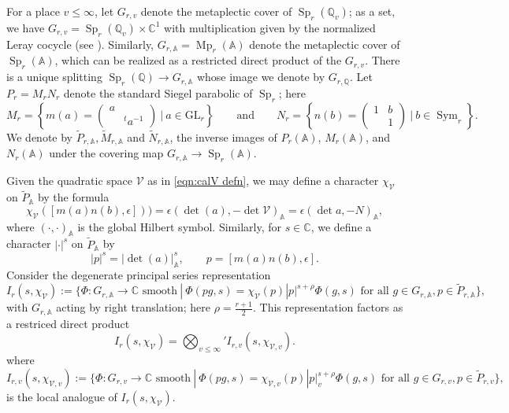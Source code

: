 \documentclass[reqno,oneside]{amsart}
\theoremstyle{plain}
\theoremstyle{remark}
\numberwithin{theorem}{section}
\newcommand{\bbA}{\mathbb A}
\newcommand{\bbC}{\mathbb C}
\newcommand{\bbQ}{\mathbb Q}
\newcommand{\calV}{\mathcal V}
\DeclareMathOperator{\Sym}{Sym}
\DeclareMathOperator{\Sp}{Sp}
\newcommand{\GL}{\mathrm{GL}}
\DeclareMathOperator{\Mp}{Mp}
\begin{document}
	For a place $v \leq \infty$, let $G_{r,v}$ denote the metaplectic cover of $\Sp_{r}(\bbQ_v)$; as a set,  we have $G_{r,v} = \Sp_r(\bbQ_v) \times \bbC^{1}$   with multiplication given by the normalized Leray cocycle (see \cite[\S 8.5]{KRYbook}).
	Similarly, $G_{r, \bbA} = \Mp_r(\bbA)$ denote the metaplectic cover of $\Sp_r(\bbA)$, which can be realized as a restricted direct product of the $G_{r,v}$. There is a unique splitting $\Sp_r(\bbQ) \to G_{r, \bbA}$ whose image we denote by $G_{r,\bbQ}$.
	Let $P_r = M_rN_r$ denote the standard Siegel parabolic of $\Sp_r$; here
	\begin{equation} \label{eqn:Siegel parabolic defns}
	M_r = \left\{ m(a) = \begin{pmatrix}a & \\ & {}^t a^{-1} \end{pmatrix} \ \Big| \ a \in \GL_r\right\} \qquad \text{and} \qquad 	N_r= \left\{ n(b) = \begin{pmatrix}1 &b \\ & 1 \end{pmatrix} \ \Big| \ b \in \Sym_r \right\} .
	\end{equation}
	We denote by $\tilde P_{r,\bbA} , \tilde M_{r, \bbA}$ and $\tilde N_{r, \bbA}$, the inverse images of $P_r(\bbA)$, $M_r(\bbA)$, and $N_r(\bbA)$ under the covering map $G_{r,\bbA} \to \Sp_r(\bbA)$.
	
	
	Given the quadratic space $\calV$ as in \eqref{eqn:calV defn}, we may define a character $\chi_{\calV}$ on $\tilde P_{\bbA}$ by the formula
	\begin{equation}
	\chi_{\calV} \left([m(a) n(b), \epsilon] \right)) = \epsilon \left( \det(a), - \det \calV \right)_{\bbA} = \epsilon \left( \det a , - N \right)_{\bbA} ,
	\end{equation}
	where $(\cdot, \cdot )_{\bbA}$ is the global Hilbert symbol. Similarly, for $s \in \mathbb C$, we define a character $| \cdot | ^s$ on $\widetilde P_{\bbA}$ by
	\begin{equation}
		\left| p \right|^{s} = | \det (a)|^s_{\bbA}, \qquad p = [m(a) n(b), \epsilon].
	\end{equation}
	Consider the degenerate principal series representation
	\begin{equation}
	I_r(s,\chi_{\calV}) := \{ \Phi\colon G_{r,\bbA} \to \bbC \text{ smooth} \ | \ \Phi(pg, s) = \chi_{\calV}(p) |p|^{s+\rho}  \Phi(g,s) \text{ for all } g \in  G_{r, \bbA}, p \in \tilde P_{r,\bbA}\},
	\end{equation}
	with $G_{r,\bbA}$ acting by right translation; here $\rho = \frac{r+1}2$.
	This representation factors as a restriced direct product
	\begin{equation}
	I_r(s,\chi_{\calV}) = {\bigotimes_{v \leq \infty}}' I_{r,v}(s,\chi_{\calV,v}).
	\end{equation}
	where
	$$
	I_{r,v}(s,\chi_{\calV,v}) := \{ \Phi\colon G_{r,v} \to \bbC \text{ smooth} \ | \ \Phi(pg, s) = \chi_{\calV,v}(p) |p|_v^{s+\rho}  \Phi(g,s) \text{ for all } g \in G_{r,v}, p \in \tilde P_{r,v}\},
	$$
	is the local analogue of $I_r(s, \chi_{\calV})$.
	
\end{document}
